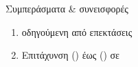 \begin{frame}{Συμπεράσματα \& συνεισφορές}
  \begin{enumerate}
    \item {} οδηγούμενη από επεκτάσεις 
    \item Επιτάχυνση \KEM {} () έως  () σε \instret
  \end{enumerate}
\end{frame}
